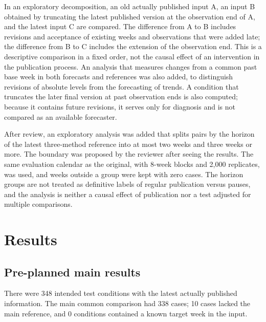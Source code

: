\documentclass[11pt]{article}
\newcommand{\gentable}[1]{\adjustbox{max width=\linewidth}{}}
\begin{document}
In an exploratory decomposition, an old actually published input A, an input B obtained by truncating the latest published version at the observation end of A, and the latest input C are compared. The difference from A to B includes revisions and acceptance of existing weeks and observations that were added late; the difference from B to C includes the extension of the observation end. This is a descriptive comparison in a fixed order, not the causal effect of an intervention in the publication process. An analysis that measures changes from a common past base week in both forecasts and references was also added, to distinguish revisions of absolute levels from the forecasting of trends. A condition that truncates the later final version at past observation ends is also computed; because it contains future revisions, it serves only for diagnosis and is not compared as an available forecaster.

After review, an exploratory analysis was added that splits pairs by the horizon of the latest three-method reference into at most two weeks and three weeks or more. The boundary was proposed by the reviewer after seeing the results. The same evaluation calendar as the original, with 8-week blocks and 2,000 replicates, was used, and weeks outside a group were kept with zero cases. The horizon groups are not treated as definitive labels of regular publication versus pauses, and the analysis is neither a causal effect of publication nor a test adjusted for multiple comparisons.

\section{Results}\label{sec:results}

\subsection{Pre-planned main results}

There were 348 intended test conditions with the latest actually published information. The main common comparison had 338 cases; 10 cases lacked the main reference, and 0 conditions contained a known target week in the input.

\begin{table}[tbp]\centering\small
\caption{WIS ratios relative to the fixed three-method ensemble with the latest input (German national analysis, pre-planned). The classical ensemble's own older inputs are listed as reference rows. Brackets: 95\% intervals from 8-week blocks. TimesFM covers only the period after its publication, so its sample size differs from Chronos-Bolt. Within a row, the candidate and the reference are compared on the same targets.}\label{tab:primary}
\gentable{tab_primary}
\end{table}
\end{document}
